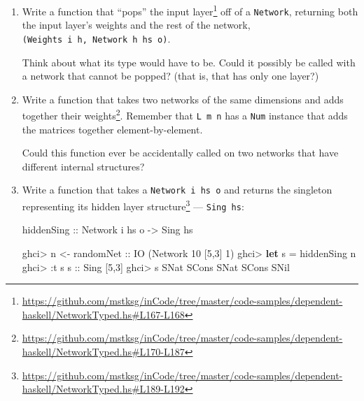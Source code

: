 \documentclass[]{article}
\newenvironment{Shaded}{}{}
\newcommand{\DataTypeTok}[1]{\textcolor[rgb]{0.56,0.13,0.00}{#1}}
\newcommand{\DecValTok}[1]{\textcolor[rgb]{0.25,0.63,0.44}{#1}}
\newcommand{\KeywordTok}[1]{\textcolor[rgb]{0.00,0.44,0.13}{\textbf{#1}}}
\newcommand{\NormalTok}[1]{#1}
\newcommand{\OperatorTok}[1]{\textcolor[rgb]{0.40,0.40,0.40}{#1}}
\newcommand{\OtherTok}[1]{\textcolor[rgb]{0.00,0.44,0.13}{#1}}
\renewcommand{\href}[2]{#2\footnote{\url{#1}}}
\begin{document}
\begin{enumerate}
\def\labelenumi{\arabic{enumi}.}
\item
  Write a function that
  \href{https://github.com/mstksg/inCode/tree/master/code-samples/dependent-haskell/NetworkTyped.hs\#L167-L168}{``pops''
  the input layer} off of a \texttt{Network}, returning both the input layer's
  weights and the rest of the network,
  \texttt{(Weights\ i\ h,\ Network\ h\ hs\ o)}.

  Think about what its type would have to be. Could it possibly be called with a
  network that cannot be popped? (that is, that has only one layer?)
\item
  Write a
  \href{https://github.com/mstksg/inCode/tree/master/code-samples/dependent-haskell/NetworkTyped.hs\#L170-L187}{function
  that takes two networks of the same dimensions and adds together their
  weights}. Remember that \texttt{L\ m\ n} has a \texttt{Num} instance that adds
  the matrices together element-by-element.

  Could this function ever be accidentally called on two networks that have
  different internal structures?
\item
  Write a function that takes a \texttt{Network\ i\ hs\ o} and
  \href{https://github.com/mstksg/inCode/tree/master/code-samples/dependent-haskell/NetworkTyped.hs\#L189-L192}{returns
  the singleton representing its hidden layer structure} --- \texttt{Sing\ hs}:

\begin{Shaded}
\begin{Highlighting}[]
\OtherTok{hiddenSing ::} \DataTypeTok{Network}\NormalTok{ i hs o }\OtherTok{{-}\textgreater{}} \DataTypeTok{Sing}\NormalTok{ hs}
\end{Highlighting}
\end{Shaded}

\begin{Shaded}
\begin{Highlighting}[]
\NormalTok{ghci}\OperatorTok{\textgreater{}}\NormalTok{ n }\OtherTok{\textless{}{-} randomNet ::} \DataTypeTok{IO}\NormalTok{ (}\DataTypeTok{Network} \DecValTok{10}\NormalTok{ \textquotesingle{}[}\DecValTok{5}\NormalTok{,}\DecValTok{3}\NormalTok{] }\DecValTok{1}\NormalTok{)}
\NormalTok{ghci}\OperatorTok{\textgreater{}} \KeywordTok{let}\NormalTok{ s }\OtherTok{=}\NormalTok{ hiddenSing n}
\NormalTok{ghci}\OperatorTok{\textgreater{}} \OperatorTok{:}\NormalTok{t s}
\OtherTok{s ::} \DataTypeTok{Sing}\NormalTok{ \textquotesingle{}[}\DecValTok{5}\NormalTok{,}\DecValTok{3}\NormalTok{]}
\NormalTok{ghci}\OperatorTok{\textgreater{}}\NormalTok{ s}
\DataTypeTok{SNat} \OtherTok{\textasciigrave{}SCons\textasciigrave{}} \DataTypeTok{SNat} \OtherTok{\textasciigrave{}SCons\textasciigrave{}} \DataTypeTok{SNil}
\end{Highlighting}
\end{Shaded}
\end{enumerate}
\end{document}

